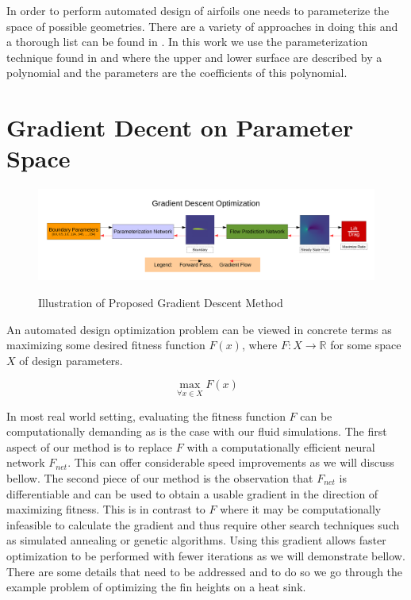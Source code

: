 \documentclass{article} %
\begin{document}
In order to perform automated design of airfoils one needs to parameterize the space of possible geometries. There are a variety of approaches in doing this and a thorough list can be found in \citet{salunke2014airfoil}. In this work we use the parameterization technique found in \citet{lane2009surface} and \citet{hilton2007universal} where the upper and lower surface are described by a polynomial and the parameters are the coefficients of this polynomial.

\section{Gradient Decent on Parameter Space}

\begin{figure}[h]
\begin{center}
\includegraphics[scale=0.34]{./gradient_descent_optimization.pdf}
\label{gradient_descent_optimization}
\end{center}
\caption{Illustration of Proposed Gradient Descent Method}
\end{figure}


An automated design optimization problem can be viewed in concrete terms as maximizing some desired fitness function $F(x)$, where $F:X \rightarrow \mathbb{R}$ for some space $X$ of design parameters.

\begin{equation}
  \max_{\forall x \in X} F(x)
\end{equation}

In most real world setting, evaluating the fitness function $F$ can be computationally demanding as is the case with our fluid simulations. The first aspect of our method is to replace $F$ with a computationally efficient neural network $F_{net}$. This can offer considerable speed improvements as we will discuss bellow. The second piece of our method is the observation that $F_{net}$ is differentiable and can be used to obtain a usable gradient in the direction of maximizing fitness. This is in contrast to $F$ where it may be computationally infeasible to calculate the gradient and thus require other search techniques such as simulated annealing or genetic algorithms. Using this gradient allows faster optimization to be performed with fewer iterations as we will demonstrate bellow. There are some details that need to be addressed and to do so we go through the example problem of optimizing the fin heights on a heat sink.
\end{document}
